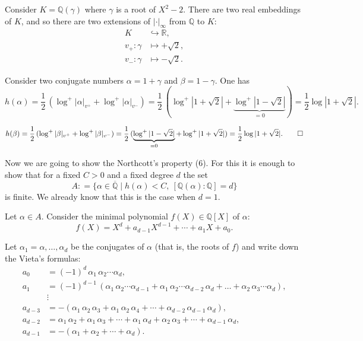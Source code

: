 \documentclass{article}
\newcommand{\dfn}{\mathrel{\mathop:}=}
\newcommand{\QQ}{\mathbb{Q}}
\newcommand{\examplesymbol}{$\blacktriangle$}
\renewcommand{\qedsymbol}{$\blacksquare$}
\theoremstyle{myplain}
\theoremstyle{mydefinition}
\newenvironment{example}
  {\pushQED{\qed}\renewcommand{\qedsymbol}{\examplesymbol}\examplex}
  {\popQED\endexamplex}
\begin{document}
\begin{example}
  Consider $K = \QQ (\gamma)$ where $\gamma$ is a root of $X^2 - 2$. There are
  two real embeddings of $K$, and so there are two extensions of
  $|\cdot|_\infty$ from $\QQ$ to $K$:
  \begin{align*}
    K & \hookrightarrow \mathbb{R},\\
    v_+\colon \gamma & \mapsto +\sqrt{2},\\
    v_-\colon \gamma & \mapsto -\sqrt{2}.
  \end{align*}

  Consider two conjugate numbers $\alpha = 1 + \gamma$ and
  $\beta = 1 - \gamma$. One has
  \[ h (\alpha) = \frac{1}{2} \, (\log^+ |\alpha|_{v^+} + \log^+ |\alpha|_{v^-}) =
    \frac{1}{2} \, (\log^+ |1 + \sqrt{2}| + \underbrace{\log^+ |1-\sqrt{2}|}_{=0}) =
    \frac{1}{2} \log |1 + \sqrt{2}|.  \]

  \[ h (\beta) = \frac{1}{2} \, (\log^+ |\beta|_{v^+} + \log^+ |\beta|_{v^-}) =
    \frac{1}{2} \, (\underbrace{\log^+ |1 - \sqrt{2}|}_{=0} + \log^+ |1+\sqrt{2}|) =
    \frac{1}{2} \log |1 + \sqrt{2}|. \qedhere \]
\end{example}

\vspace{1em}

Now we are going to show the Northcott's property (6). For this it is enough to
show that for a fixed $C > 0$ and a fixed degree $d$ the set
$$A \dfn \{ \alpha\in\overline{\QQ} \mid h (\alpha) < C, ~ [\QQ (\alpha) : \QQ] = d \}$$
is finite. We already know that this is the case when $d = 1$.

Let $\alpha \in A$. Consider the minimal polynomial $f (X) \in \QQ [X]$ of
$\alpha$:
$$f (X) = X^d + a_{d-1} X^{d-1} + \cdots + a_1 X + a_0.$$

Let $\alpha_1 = \alpha, \ldots, \alpha_d$ be the conjugates of $\alpha$ (that
is, the roots of $f$) and write down the Vieta's formulas:
\begin{align*}
  a_0 & = (-1)^d \, \alpha_1 \, \alpha_2 \cdots \alpha_d,\\
  a_1 & = (-1)^{d-1} \, (\alpha_1 \, \alpha_2 \cdots \alpha_{d-1} + \alpha_1 \, \alpha_2 \cdots \alpha_{d-2}\,\alpha_d + \ldots + \alpha_2 \, \alpha_3 \cdots \alpha_d), \\
      & \vdots \\
  a_{d-3} & = -(\alpha_1\,\alpha_2\,\alpha_3 + \alpha_1\,\alpha_2\,\alpha_4 + \cdots + \alpha_{d-2}\,\alpha_{d-1}\,\alpha_d), \\
  a_{d-2} & = \alpha_1\,\alpha_2 + \alpha_1\,\alpha_3 + \cdots + \alpha_1\,\alpha_d + \alpha_2\,\alpha_3 + \cdots + \alpha_{d-1}\,\alpha_d, \\
  a_{d-1} & = -(\alpha_1 + \alpha_2 + \cdots + \alpha_d).
\end{align*}
\end{document}
